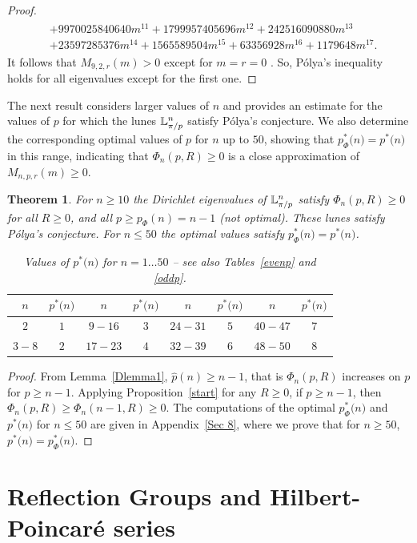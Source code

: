 \documentclass[11pt,a4paper,times]{amsart}
\theoremstyle{plain}
\newtheorem{thm}{Theorem}[section]
\theoremstyle{definition}
\numberwithin{equation}{section}
\newcommand{\pin}[1]{p^*{#1}}
\newcommand{\pnphi}{p_{\Phi}(n)}
\newcommand{\piphi}[1]{p^*_{\Phi}{#1}}
\newcommand{\luned}[2]{\raisebox{0.5pt}{${}$}\mathbb{L}^{#1}_{\pi/#2}}
\newcommand{\txtg}{\textcolor{green}}
\begin{document}
{\begin{proof}
\begin{gather*}
\begin{array}{ll}
 & + 9970025840640 m^{11} + 
 1799957405696 m^{12} + 242516090880 m^{13}\\
 & + 23597285376 m^{14} + 
 1565589504 m^{15} + 63356928 m^{16} + 1179648 m^{17}.\end{array}
\end{gather*}
It follows that $M_{9,2,r}(m)>0$  except  for $m=r=0$ . So,  P\'{o}lya's inequality holds for all eigenvalues except for the first one.
\end{proof}
%
The next result considers larger values of $n$ and provides an estimate for the values of $p$ for which the lunes $\luned{n}{p}$
satisfy P\'{o}lya's conjecture. We also determine the corresponding optimal values of $p$ for $n$ up to $50$, showing that
$\piphi(n)=\pin(n)$ in this range, indicating that $\Phi_n(p,R)\geq 0$ is a close approximation of $M_{n,p,r}(m)\geq 0$.
\begin{thm}\label{thmD}  
For $n\geq 10$  the  Dirichlet eigenvalues of  $\luned{n}{p}$ satisfy $\Phi_n(p,R)\geq 0$ for all $R\geq 0$, and  all $p\geq \pnphi=n-1 $ (not optimal).
These lunes satisfy P\'{o}lya's conjecture.  For $n\leq 50$ the optimal values satisfy $\piphi(n)=\pin(n)$.
{\footnotesize 
\begin{table}[h]
\centering
\begin{tabular}{|c|c||c|c||c|c||c|c|}
\hline
$n$ & $\pin(n)$ & $n$ & $\pin(n)$ & $n$ & $\pin(n)$ & $n$ & $\pin(n)$\\
\hline
$2$ &$1$ &$9-16$ &$3$ &$24-31$ &$5$ &$40-47$ &$7$ \\
\hline
$3-8$ &$2$ &$17-23$ &$4$ &$32-39$ &$6$ &$48-50$ &$8$\\
 \hline
 \end{tabular}
 \vspace*{3mm}
 \caption{Values of $\pin(n)$ for $n=1\dots 50$ -- see also Tables~\ref{evenp} and \ref{oddp}.}
 \end{table}}  
\end{thm}
%
\begin{proof} From Lemma~\ref{Dlemma1},  $\hat{p}(n)\geq n-1$, that is $\Phi_n(p,R)$ increases on $p$ for $p\geq n-1$. Applying Proposition~\ref{start} for any $R\geq 0$, if $p\geq n-1$, then  $\Phi_n(p,R)\geq \Phi_n(n-1,R)\geq 0$. The computations of the optimal $\piphi(n)$ and  $\pin(n)$ for $n \leq 50$ are given in Appendix~\ref{Sec 8},
where we prove that for $n\geq 50$, $\pin(n)=\piphi(n)$.
\end{proof}

\appendix

\section{Reflection Groups and Hilbert-Poincar\'{e} series }\label{ApA}

}
\end{document}
